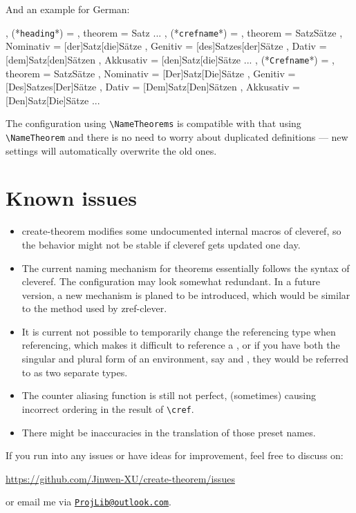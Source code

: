 \documentclass[classical]{einfart}
\newcommand{\commandoption}[1]{\textcolor{code-keys}{\texttt{#1}}}
\newcommand{\createtheorempackage}{\textsf{create-theorem}}
\begin{document}
And an example for German:

\begin{code}
  {
    , (*\commandoption{heading}*) =   {
                    , theorem       = Satz
                    ...
                  }
    , (*\commandoption{crefname}*) =  {
                    , theorem       = { {Satz}{Sätze}
                        , Nominativ = [der]{Satz}[die]{Sätze}
                        , Genitiv   = [des]{Satzes}[der]{Sätze}
                        , Dativ     = [dem]{Satz}[den]{Sätzen}
                        , Akkusativ = [den]{Satz}[die]{Sätze}
                      }
                    ...
                  }
    , (*\commandoption{Crefname}*) =  {
                    , theorem       = { {Satz}{Sätze}
                        , Nominativ = [Der]{Satz}[Die]{Sätze}
                        , Genitiv   = [Des]{Satzes}[Der]{Sätze}
                        , Dativ     = [Dem]{Satz}[Den]{Sätzen}
                        , Akkusativ = [Den]{Satz}[Die]{Sätze}
                      }
                    ...
                  }
  }
\end{code}

\medskip
The configuration using \lstinline|\NameTheorems| is compatible with that using \lstinline|\NameTheorem| and there is no need to worry about duplicated definitions --- new settings will automatically overwrite the old ones.


\clearpage
\section{Known issues}

\begin{itemize}
    \item \createtheorempackage{} modifies some undocumented internal macros of \textsf{cleveref}, so the behavior might not be stable if \textsf{cleveref} gets updated one day.
    \item The current naming mechanism for theorems essentially follows the syntax of \textsf{cleveref}. The configuration may look somewhat redundant. In a future version, a new mechanism is planed to be introduced, which would be similar to the method used by \textsf{zref-clever}.
    \item It is current not possible to temporarily change the referencing type when referencing, which makes it difficult to reference a , or if you have both the singular and plural form of an environment, say  and , they would be referred to as two separate types.
    \item The counter aliasing function is still not perfect, (sometimes) causing incorrect ordering in the result of \lstinline|\cref|.
    \item There might be inaccuracies in the translation of those preset names.
\end{itemize}

\medskip
If you run into any issues or have ideas for improvement, feel free to discuss on:
\begin{center}
    \url{https://github.com/Jinwen-XU/create-theorem/issues}
\end{center}
or email me via \href{mailto:ProjLib@outlook.com}{\texttt{ProjLib@outlook.com}}.
\end{document}
